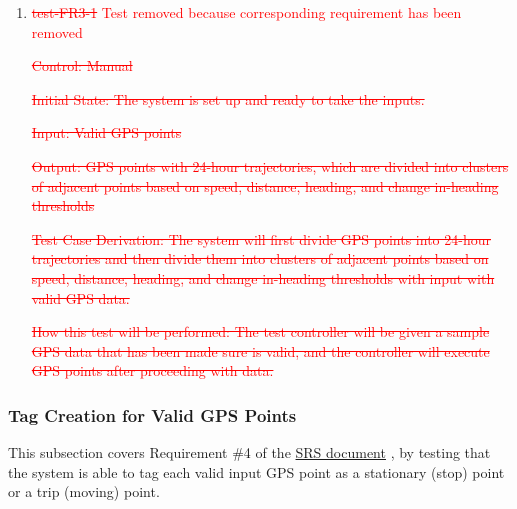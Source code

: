 \documentclass[12pt, titlepage]{article}
\begin{document}
\begin{enumerate}

\item{\textcolor{red}{\sout{test-FR3-1} Test removed because corresponding requirement has been removed}} \label{test-FR3-1}

\textcolor{red}{\sout{Control: Manual}}
				
\textcolor{red}{\sout{Initial State: The system is set up and ready to take the inputs.}}
					
\textcolor{red}{\sout{Input: Valid GPS points}}
					
\textcolor{red}{\sout{Output: GPS points with 24-hour trajectories, which are divided into clusters of
adjacent points based on speed, distance, heading, and change in-heading thresholds}}

\textcolor{red}{\sout{Test Case Derivation: The system will first divide GPS points into 24-hour trajectories and then divide them into clusters of adjacent points based on speed, distance, heading, and change in-heading thresholds with input with valid GPS data.}}
					
\textcolor{red}{\sout{How this test will be performed: The test controller will be given a sample GPS data that has been made sure is valid, and the controller will execute GPS points after proceeding with data.}}

\end{enumerate}

\subsubsection{Tag Creation for Valid GPS Points}

This subsection covers Requirement \#4 of the \href{https://github.com/paezha/PyERT-BLACK/blob/main/docs/SRS/SRS.pdf}{SRS document} \citep{SRS}, by testing that the system is able to tag each valid input GPS point as a stationary (stop) point or a trip (moving) point.
\end{document}
